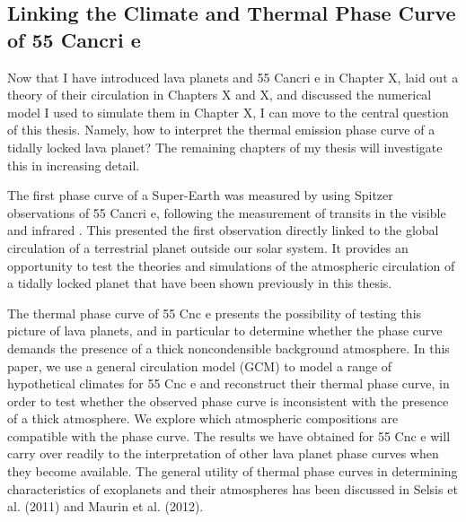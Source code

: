 \begin{SingleSpace}
\chapter{Linking the Climate and Thermal Phase Curve of 55 Cancri e}
\vspace{0.5cm}
\end{SingleSpace}
\vspace{0.5cm}






Now that I have introduced lava planets and 55 Cancri e in Chapter X, laid out a theory of their circulation in Chapters X and X, and discussed the numerical model I used to simulate them in Chapter X, I can move to the central question of this thesis. Namely, how to interpret the thermal emission phase curve of a tidally locked lava planet? The remaining chapters of my thesis will investigate this in increasing detail.


The first phase curve of a Super-Earth was measured by \citet{demory201655cnce} using Spitzer observations of 55 Cancri e, following the measurement of transits in the visible \citep{winn201155cnce} and infrared
\citep{demory201155cnce}. This presented the first observation directly linked to the global circulation of a terrestrial planet outside our solar system. It provides an opportunity to test the theories and simulations of the atmospheric circulation of a tidally locked planet that have been shown previously in this thesis.

The thermal phase curve of 55 Cnc e presents the possibility of testing this picture of lava planets, and in particular to determine whether the phase curve demands
the presence of a thick noncondensible background atmosphere. In this paper, we use a general circulation
model (GCM) to model a range of hypothetical climates
for 55 Cnc e and reconstruct their thermal phase curve,
in order to test whether the observed phase curve is inconsistent with the presence of a thick atmosphere. We
explore which atmospheric compositions are compatible
with the phase curve. The results we have obtained
for 55 Cnc e will carry over readily to the interpretation of other lava planet phase curves when they become
available. The general utility of thermal phase curves in
determining characteristics of exoplanets and their atmospheres has been discussed in Selsis et al. (2011) and
Maurin et al. (2012).


